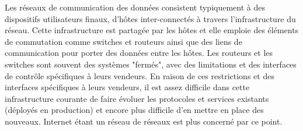 Les réseaux de communication des données consistent typiquement à des dispositifs utilisateurs finaux, d'hôtes inter-connectés à travers l'infrastructure du réseau. Cette infrastructure est partagée par les hôtes et elle emploie des éléments de commutation comme switches et routeurs ainsi que des liens de communication pour porter des données entre les hôtes. Les routeurs et les switches sont souvent des systèmes "fermés", avec des limitations et des interfaces de contrôle spécifiques à leurs vendeurs. 
En raison de ces restrictions et des interfaces spécifiques à leurs vendeurs, il est assez difficile dans cette infrastructure courante de faire évoluer les protocoles et services existants (déployés en production) et encore plus difficile d'en mettre en place des nouveaux.
Internet étant un réseau de réseaux est plus concerné par ce point. \cite{SurveySDNArchi}






